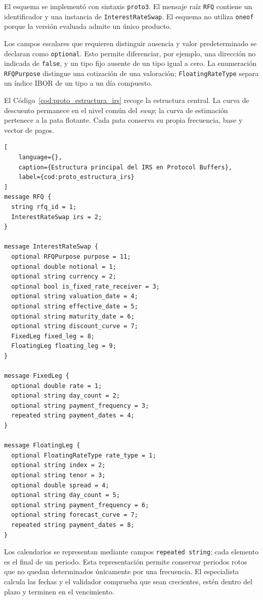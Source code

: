 El esquema se implementó con sintaxis \texttt{proto3}. El mensaje raíz \texttt{RFQ} contiene un identificador y una instancia de \texttt{InterestRateSwap}. El esquema no utiliza \texttt{oneof} porque la versión evaluada admite un único producto.

Los campos escalares que requieren distinguir ausencia y valor predeterminado se declaran como \texttt{optional}. Esto permite diferenciar, por ejemplo, una dirección no indicada de \texttt{false}, y un tipo fijo ausente de un tipo igual a cero. La enumeración \texttt{RFQPurpose} distingue una cotización de una valoración; \texttt{FloatingRateType} separa un índice IBOR de un tipo a un día compuesto.

El Código~\ref{cod:proto_estructura_irs} recoge la estructura central. La curva de descuento permanece en el nivel común del \textit{swap}; la curva de estimación pertenece a la pata flotante. Cada pata conserva su propia frecuencia, base y vector de pagos.

\begin{lstlisting}[
    language={},
    caption={Estructura principal del IRS en Protocol Buffers},
    label={cod:proto_estructura_irs}
]
message RFQ {
  string rfq_id = 1;
  InterestRateSwap irs = 2;
}

message InterestRateSwap {
  optional RFQPurpose purpose = 11;
  optional double notional = 1;
  optional string currency = 2;
  optional bool is_fixed_rate_receiver = 3;
  optional string valuation_date = 4;
  optional string effective_date = 5;
  optional string maturity_date = 6;
  optional string discount_curve = 7;
  FixedLeg fixed_leg = 8;
  FloatingLeg floating_leg = 9;
}

message FixedLeg {
  optional double rate = 1;
  optional string day_count = 2;
  optional string payment_frequency = 3;
  repeated string payment_dates = 4;
}

message FloatingLeg {
  optional FloatingRateType rate_type = 1;
  optional string index = 2;
  optional string tenor = 3;
  optional double spread = 4;
  optional string day_count = 5;
  optional string payment_frequency = 6;
  optional string forecast_curve = 7;
  repeated string payment_dates = 8;
}
\end{lstlisting}

Los calendarios se representan mediante campos \texttt{repeated string}; cada elemento es el final de un periodo. Esta representación permite conservar periodos rotos que no quedan determinados únicamente por una frecuencia. El especialista calcula las fechas y el validador comprueba que sean crecientes, estén dentro del plazo y terminen en el vencimiento.

